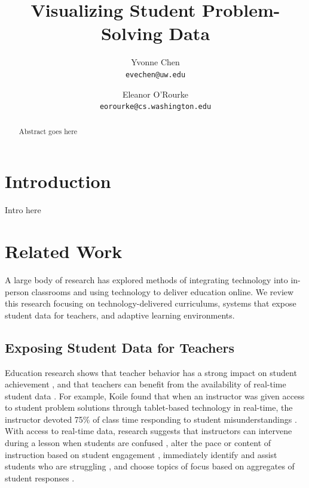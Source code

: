 \documentclass{sigchi}
\begin{document}
\author{
  Yvonne Chen\\
  \texttt{evechen@uw.edu}
  \and
  Eleanor O'Rourke\\
  \texttt{eorourke@cs.washington.edu}
}
\title{Visualizing Student Problem-Solving Data}


\maketitle

\begin{abstract}
Abstract goes here
\end{abstract}




\section{Introduction}
Intro here

\section{Related Work}
A large body of research has explored methods of integrating technology into in-person classrooms and using technology to deliver education online. We review this research focusing on technology-delivered curriculums, systems that expose student data for teachers, and adaptive learning environments.

\subsection{Exposing Student Data for Teachers}
Education research shows that teacher behavior has a strong impact on student achievement \cite{Hill2005, Wentzel2002, Reeve2004, Wright1997}, and that teachers can benefit from the availability of real-time student data \cite{Balaam2010, Koile2006, Lazar2007}. For example, Koile found that when an instructor was given access to student problem solutions through tablet-based technology in real-time, the instructor devoted 75\% of class time responding to student misunderstandings \cite{Koile2006}. With access to real-time data, research suggests that instructors can intervene during a lesson when students are confused \cite{Hickey2014}, alter the pace or content of instruction based on student engagement \cite{Balaam2010}, immediately identify and assist students who are struggling \cite{Lazar2007}, and choose topics of focus based on aggregates of student responses \cite{Koile2006}. 
\end{document}

